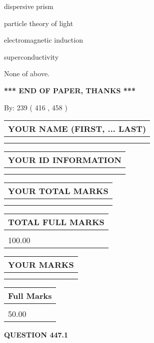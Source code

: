 \documentclass[12pt]{article}
\begin{document}
 
dispersive prism
 
 
particle theory of light
 
 
electromagnetic induction
 
 
superconductivity
 
 
 None of above.
 
 
   
   
\vspace{1.0in} 
{\textbf{\large{ *** END OF PAPER, THANKS *** }}} 
   
   
\hspace{1.0in} By: 
 239 ( 416 ,  458 )
   
   
   
   
\newpage 
\setcounter{page}{ 
   447001 } 
   
   
   
   
\noindent\begin{tabular}{|l|}
\hline
YOUR NAME (FIRST, ... LAST)  \\
\hline
 \\ 
 \\ 
\hline
\end{tabular}
\hspace{0.05in} \begin{tabular}{|l|}
\hline
 YOUR   ID   INFORMATION  \\
\hline
 \\ 
 \\ 
\hline
\end{tabular}
   
   
\vspace{0.2in}\noindent\begin{tabular}{|l|}
\hline
YOUR TOTAL MARKS  \\
\hline
 \\ 
 \\ 
\hline
\end{tabular}
\hspace{0.05in} \begin{tabular}{|l|}
\hline
TOTAL FULL MARKS  \\
\hline
 \\ 
100.00 \\
\hline
\end{tabular}
  
\vspace{0.2in}
  
\noindent\begin{tabular}{|l|}
\hline
 YOUR MARKS  \\
\hline
 \\ 
 \\ 
\hline
\end{tabular}
\hspace{0.05in} \begin{tabular}{|l|}
\hline
 Full Marks  \\
\hline
 \\ 
50.00 \\
\hline
\end{tabular}
{\textbf{\Large{QUESTION
447.1 
}}}
  
\end{document}

